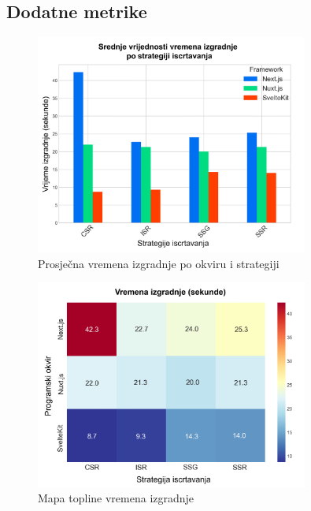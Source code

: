 \subsection{Dodatne metrike}

\begin{figure}[H]
    \centering
    \includegraphics[width=0.8\textwidth]{slike/rezultati/dodatne-metrike/average_build_times_by_framework_and_strategy.png}
    \caption{Prosječna vremena izgradnje po okviru i strategiji}
    \label{fig:average_build_times_by_framework_and_strategy}
\end{figure}

\begin{figure}[H]
    \centering
    \includegraphics[width=0.8\textwidth]{slike/rezultati/dodatne-metrike/build_times_heat_map.png}
    \caption{Mapa topline vremena izgradnje}
    \label{fig:build_times_heat_map}
\end{figure}

